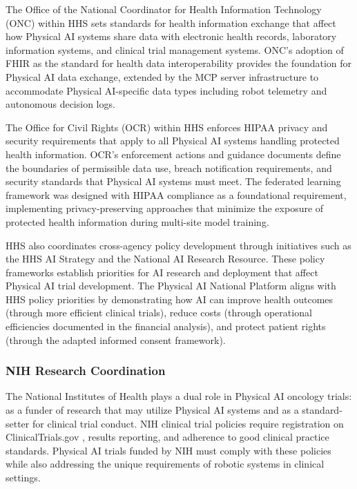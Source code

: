 The Office of the National Coordinator for Health Information Technology
(ONC) within HHS sets standards for health information exchange that affect
how Physical AI systems share data with electronic health records, laboratory
information systems, and clinical trial management systems. ONC's adoption of
FHIR \cite{hl7-fhir} as the standard for health data interoperability
provides the foundation for Physical AI data exchange, extended by the MCP
server infrastructure \cite{national-mcp-paper} to accommodate Physical
AI-specific data types including robot telemetry and autonomous decision logs.

The Office for Civil Rights (OCR) within HHS enforces HIPAA \cite{hipaa}
privacy and security requirements that apply to all Physical AI systems
handling protected health information. OCR's enforcement actions and guidance
documents define the boundaries of permissible data use, breach notification
requirements, and security standards that Physical AI systems must meet. The
federated learning framework \cite{fl-paper} was designed with HIPAA
compliance as a foundational requirement, implementing privacy-preserving
approaches that minimize the exposure of protected health information during
multi-site model training.

HHS also coordinates cross-agency policy development through initiatives
such as the HHS AI Strategy and the National AI Research Resource. These
policy frameworks establish priorities for AI research and deployment that
affect Physical AI trial development. The Physical AI National Platform
aligns with HHS policy priorities by demonstrating how AI can improve health
outcomes (through more efficient clinical trials), reduce costs (through
operational efficiencies documented in the financial analysis), and protect
patient rights (through the adapted informed consent framework).

\subsubsection{NIH Research Coordination}

The National Institutes of Health plays a dual role in Physical AI oncology
trials: as a funder of research that may utilize Physical AI systems and as
a standard-setter for clinical trial conduct. NIH clinical trial policies
require registration on ClinicalTrials.gov \cite{clinicaltrials-gov}, results
reporting, and adherence to good clinical practice standards. Physical AI
trials funded by NIH must comply with these policies while also addressing
the unique requirements of robotic systems in clinical settings.

